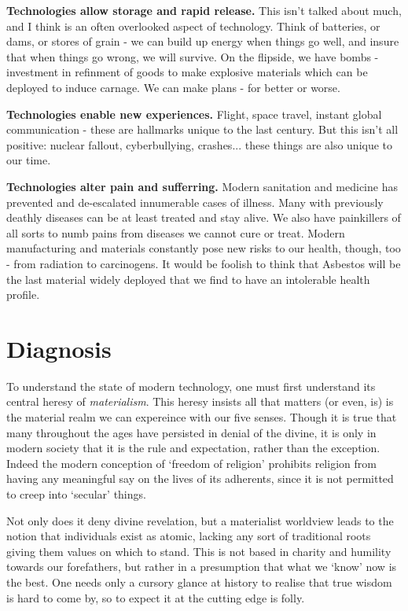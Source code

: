 \documentclass[letterpaper]{article}
\begin{document}
\textbf{Technologies allow storage and rapid release.} This isn't talked about much, and I think is an often overlooked aspect of technology. Think of batteries, or dams, or stores of grain - we can build up energy when things go well, and insure that when things go wrong, we will survive. On the flipside, we have bombs - investment in refinment of goods to make explosive materials which can be deployed to induce carnage. We can make plans - for better or worse.

\textbf{Technologies enable new experiences.} Flight, space travel, instant global communication - these are hallmarks unique to the last century. But this isn't all positive: nuclear fallout, cyberbullying, crashes... these things are also unique to our time.

\textbf{Technologies alter pain and sufferring.} Modern sanitation and medicine has prevented and de-escalated innumerable cases of illness. Many with previously deathly diseases can be at least treated and stay alive. We also have painkillers of all sorts to numb pains from diseases we cannot cure or treat. Modern manufacturing and materials constantly pose new risks to our health, though, too - from radiation to carcinogens. It would be foolish to think that Asbestos will be the last material widely deployed that we find to have an intolerable health profile.


\section{Diagnosis}

To understand the state of modern technology, one must first understand its central heresy of \textit{materialism}. This heresy insists all that matters (or even, is) is the material realm we can expereince with our five senses. Though it is true that many throughout the ages have persisted in denial of the divine, it is only in modern society that it is the rule and expectation, rather than the exception. Indeed the modern conception of `freedom of religion' prohibits religion from having any meaningful say on the lives of its adherents, since it is not permitted to creep into `secular' things.

Not only does it deny divine revelation, but a materialist worldview leads to the notion that individuals exist as atomic, lacking any sort of traditional roots giving them values on which to stand. This is not based in charity and humility towards our forefathers, but rather in a presumption that what we `know' now is the best. One needs only a cursory glance at history to realise that true wisdom is hard to come by, so to expect it at the cutting edge is folly.
\end{document}
